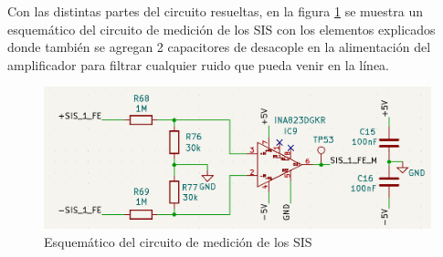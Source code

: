Con las distintas partes del circuito resueltas, en la figura \ref{fig:sis_medicion} se muestra un esquemático del circuito de medición de los SIS con los elementos explicados donde también se agregan 2 capacitores de desacople en la alimentación del amplificador para filtrar cualquier ruido que pueda venir en la línea. 



\begin{figure}[H]
    \centering
    \includegraphics[width = \linewidth]{img/sis_medicion.png}
    \caption{Esquemático del circuito de medición de los SIS}
    \label{fig:sis_medicion}
\end{figure}


